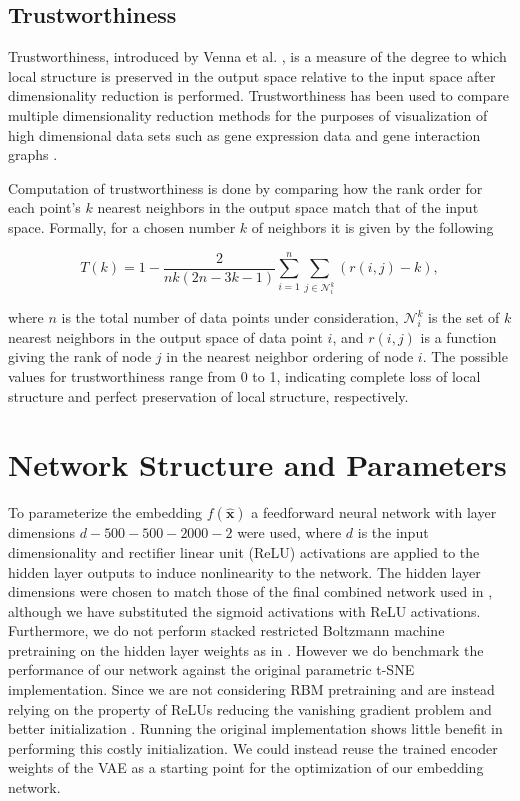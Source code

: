 \subsection{Trustworthiness}

Trustworthiness, introduced by Venna et al. \cite{trustworthiness}, is a measure of the degree to which local structure is preserved in the output space relative to the input space after dimensionality reduction is performed. Trustworthiness has been used to compare multiple dimensionality reduction methods for the purposes of visualization of high dimensional data sets such as gene expression data \cite{trustworthiness_gene_expression} and gene interaction graphs \cite{trustworthiness_gene_interaction}.

Computation of trustworthiness is done by comparing how the rank order for each point's $k$ nearest neighbors in the output space match that of the input space. Formally, for a chosen number $k$ of neighbors it is given by the following 

$$T(k) = 1 - \frac{2}{nk (2n - 3k - 1)} \sum^{n}_{i=1} \sum_{j \in \mathcal{N}_{i}^{k}} (r(i, j) - k),$$

where $n$ is the total number of data points under consideration, $\mathcal{N}_{i}^{k}$ is the set of $k$ nearest neighbors in the output space of data point $i$, and $r(i, j)$ is a function giving the rank of node $j$ in the nearest neighbor ordering of node $i$. The possible values for trustworthiness range from 0 to 1, indicating complete loss of local structure and perfect preservation of local structure, respectively.

\section{Network Structure and Parameters}
\label{section:network_structure_and_parameters}

To parameterize the embedding $f(\mathbf{\hat{x}})$ a feedforward neural network with layer dimensions $d - 500 - 500 - 2000 - 2$ were used, where $d$ is the input dimensionality and rectifier linear unit (ReLU) activations are applied to the hidden layer outputs to induce nonlinearity to the network. The hidden layer dimensions were chosen to match those of the final combined network used in \cite{parametric_tsne}, although we have substituted the sigmoid activations with ReLU activations. Furthermore, we do not perform stacked restricted Boltzmann machine pretraining on the hidden layer weights as in \cite{parametric_tsne}. However we do benchmark the performance of our network against the original parametric t-SNE implementation. Since we are not considering RBM pretraining and are instead relying on the property of ReLUs reducing the vanishing gradient problem \cite{relu} and better initialization \cite{xavier_initializer}. Running the original implementation shows little benefit in performing this costly initialization. We could instead reuse the trained encoder weights of the VAE as a starting point for the optimization of our embedding network.

